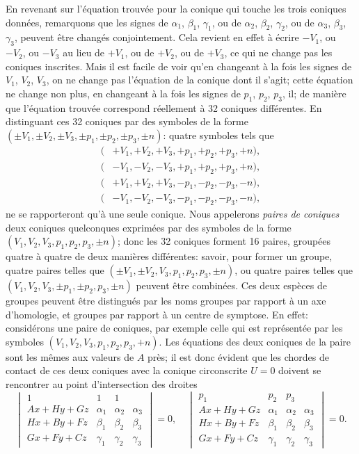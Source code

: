 \documentclass[12pt,a4paper]{article}
\theoremstyle{definition}
\begin{document}
En revenant sur l'\'{e}quation trouv\'{e}e pour la conique qui touche les trois coniques donn\'{e}es, remarquons que les signes de $\alpha_1$, $\beta_1$, $\gamma_1$, ou de $\alpha_2$, $\beta_2$, $\gamma_2$, ou de $\alpha_3$, $\beta_3$, $\gamma_3$, peuvent \^{e}tre chang\'{e}s conjointement. Cela revient en effet \`{a} \'{e}crire $-V_1$, ou $-V_2$, ou $-V_3$ au lieu de $+V_1$, ou de $+V_2$, ou de $+V_3$, ce qui ne change pas les coniques inscrites. Mais il est facile de voir qu'en changeant \`{a} la fois les signes de $V_1$, $V_2$, $V_3$, on ne change pas l'\'{e}quation de la conique dont il s'agit; cette \'{e}quation ne change non plus, en changeant \`{a} la fois les signes de $p_1$, $p_2$, $p_3$, il; de mani\`{e}re que l'\'{e}quation trouv\'{e}e correspond r\'{e}ellement \`{a} 32 coniques diff\'{e}rentes. En distinguant ces 32 coniques par des symboles de la forme $(\pm V_1, \pm V_2, \pm V_3, \pm p_1, \pm p_2, \pm p_3, \pm n)$: quatre symboles tels que
\begin{align*}
(&+V_1, +V_2, +V_3, +p_1, +p_2, +p_3, +n), \\
(&-V_1, -V_2, -V_3, +p_1, +p_2, +p_3, +n), \\
(&+V_1, +V_2, +V_3, -p_1, -p_2, -p_3, -n), \\
(&-V_1, -V_2, -V_3, -p_1, -p_2, -p_3, -n),
\end{align*}
ne se rapporteront qu'\`{a} une seule conique. Nous appelerons \emph{paires de coniques} deux coniques quelconques exprim\'{e}es par des symboles de la forme $(V_1, V_2, V_3, p_1, p_2, p_3, \pm n)$; donc les 32 coniques forment 16 paires, group\'{e}es quatre \`{a} quatre de deux mani\`{e}res diff\'{e}rentes: savoir, pour former un groupe, quatre paires telles que $(\pm V_1, \pm V_2, V_3, p_1, p_2, p_3, \pm n)$, ou quatre paires telles que $(V_1, V_2, V_3, \pm p_1, \pm p_2, p_3, \pm n)$ peuvent \^{e}tre combin\'{e}es. Ces deux esp\`{e}ces de groupes peuvent \^{e}tre distingu\'{e}s par les noms groupes par rapport \`{a} un axe d'homologie, et groupes par rapport \`{a} un centre de symptose.
En effet: consid\'{e}rons une paire de coniques, par exemple celle qui est repr\'{e}sent\'{e}e par les symboles $(V_1, V_2, V_3, p_1, p_2, p_3, +n)$. Les \'{e}quations des deux coniques de la paire sont les m\^{e}mes aux valeurs de $A$ pr\`{e}s; il est donc \'{e}vident que les chordes de contact de ces deux coniques avec la conique circonscrite $U = 0$ doivent se rencontrer au point d'intersection des droites
\[
\begin{vmatrix} 1 & 1 & 1 \\ Ax + Hy + Gz & \alpha_1 & \alpha_2 & \alpha_3 \\ Hx + By + Fz & \beta_1 & \beta_2 & \beta_3 \\ Gx + Fy + Cz & \gamma_1 & \gamma_2 & \gamma_3 \end{vmatrix} = 0, \quad
\begin{vmatrix} p_1 & p_2 & p_3 \\ Ax + Hy + Gz & \alpha_1 & \alpha_2 & \alpha_3 \\ Hx + By + Fz & \beta_1 & \beta_2 & \beta_3 \\ Gx + Fy + Cz & \gamma_1 & \gamma_2 & \gamma_3 \end{vmatrix} = 0.
\]
\end{document}
